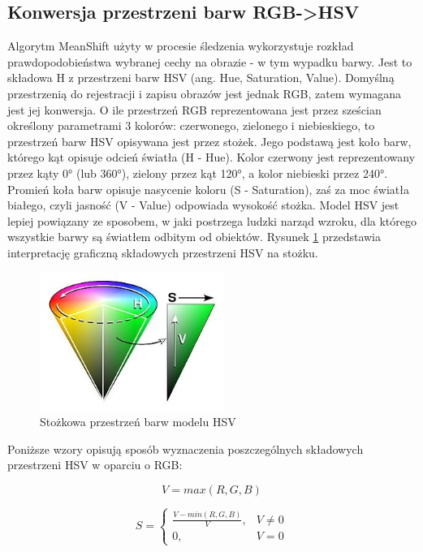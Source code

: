 \subsection{Konwersja przestrzeni barw RGB->HSV}
\label{fig:HSV_cone}
Algorytm MeanShift użyty w procesie śledzenia wykorzystuje rozkład prawdopodobieństwa wybranej cechy na obrazie - w tym wypadku barwy. Jest to składowa H z przestrzeni barw HSV (ang. Hue, Saturation, Value). Domyślną przestrzenią do rejestracji i zapisu obrazów jest jednak RGB, zatem wymagana jest jej konwersja. O ile przestrzeń RGB reprezentowana jest przez sześcian określony parametrami 3 kolorów: czerwonego, zielonego i niebieskiego, to przestrzeń barw HSV opisywana jest przez stożek. Jego podstawą jest koło barw, którego kąt opisuje odcień światła (H - Hue). Kolor czerwony jest reprezentowany przez kąty 0\si{\degree} (lub 360\si{\degree}), zielony przez kąt 120\si{\degree}, a kolor niebieski przez 240\si{\degree}. Promień koła barw opisuje nasycenie koloru (S - Saturation), zaś za moc światła białego, czyli jasność (V - Value) odpowiada wysokość stożka. Model HSV jest lepiej powiązany ze sposobem, w jaki postrzega ludzki narząd wzroku, dla którego wszystkie barwy są światłem odbitym od obiektów. Rysunek \ref{fig:HSV_cone} przedstawia interpretację graficzną składowych przestrzeni HSV na stożku.

\begin{figure}[h]
	\centering
	\includegraphics[width=6cm]{2_HSV.jpg}
	\caption{Stożkowa przestrzeń barw modelu HSV}
	\label{fig:HSV_cone}
\end{figure}

Poniższe wzory opisują sposób wyznaczenia poszczególnych składowych przestrzeni HSV w oparciu o RGB:

\begin{equation}
\label{HSV_first}
V=max(R,G,B)
\end{equation}

\begin{equation}
S=\begin{cases}
\frac{V-min(R,G,B)}{V}, & V\neq0 \\
0, & V=0
\end{cases}
\end{equation}

